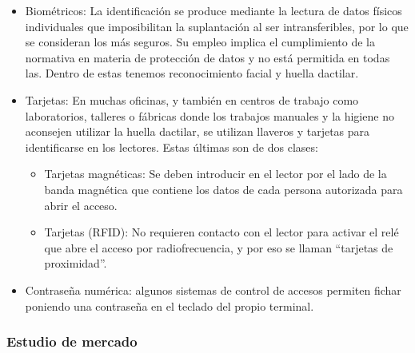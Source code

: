 \begin{itemize}
\item Biométricos: La identificación se produce mediante la lectura de datos físicos individuales que imposibilitan la suplantación al ser intransferibles, por lo que se consideran los más seguros. Su empleo implica el cumplimiento de la normativa en materia de protección de datos y no está permitida en todas las. Dentro de estas tenemos reconocimiento facial y huella dactilar.
\item Tarjetas: En muchas oficinas, y también en centros de trabajo como laboratorios, talleres o fábricas donde los trabajos manuales y la higiene no aconsejen utilizar la huella dactilar, se utilizan llaveros y tarjetas para identificarse en los lectores. Estas últimas son de dos clases:
	\begin{itemize}
	\item Tarjetas magnéticas: Se deben introducir en el lector por el lado de la banda magnética que contiene los datos de cada persona autorizada para abrir el acceso.
	\item Tarjetas (RFID): No requieren contacto con el lector para activar el relé que abre el acceso por radiofrecuencia, y por eso se llaman ``tarjetas de proximidad''.
	\end{itemize}
\item Contraseña numérica: algunos sistemas de control de accesos permiten fichar poniendo una contraseña en el teclado del propio terminal.
\end{itemize}

\subsubsection{Estudio de mercado}

